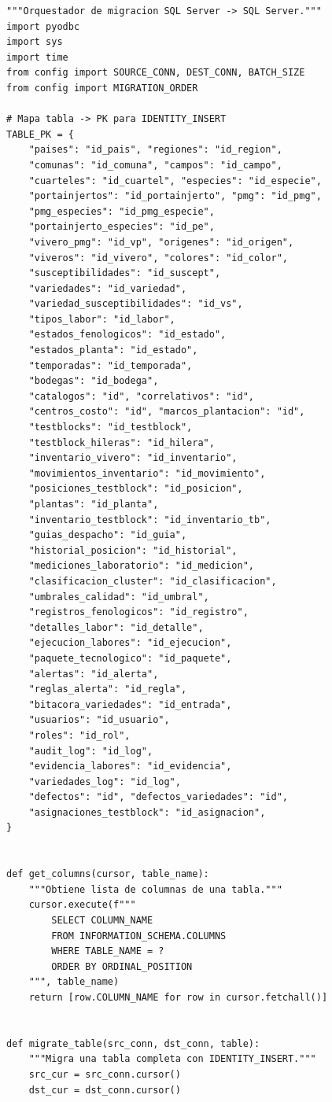 \documentclass[12pt,a4paper,twoside]{report}
\begin{document}
\begin{lstlisting}[style=pythonstyle, caption={migrate.py --- Orquestador principal}]
"""Orquestador de migracion SQL Server -> SQL Server."""
import pyodbc
import sys
import time
from config import SOURCE_CONN, DEST_CONN, BATCH_SIZE
from config import MIGRATION_ORDER

# Mapa tabla -> PK para IDENTITY_INSERT
TABLE_PK = {
    "paises": "id_pais", "regiones": "id_region",
    "comunas": "id_comuna", "campos": "id_campo",
    "cuarteles": "id_cuartel", "especies": "id_especie",
    "portainjertos": "id_portainjerto", "pmg": "id_pmg",
    "pmg_especies": "id_pmg_especie",
    "portainjerto_especies": "id_pe",
    "vivero_pmg": "id_vp", "origenes": "id_origen",
    "viveros": "id_vivero", "colores": "id_color",
    "susceptibilidades": "id_suscept",
    "variedades": "id_variedad",
    "variedad_susceptibilidades": "id_vs",
    "tipos_labor": "id_labor",
    "estados_fenologicos": "id_estado",
    "estados_planta": "id_estado",
    "temporadas": "id_temporada",
    "bodegas": "id_bodega",
    "catalogos": "id", "correlativos": "id",
    "centros_costo": "id", "marcos_plantacion": "id",
    "testblocks": "id_testblock",
    "testblock_hileras": "id_hilera",
    "inventario_vivero": "id_inventario",
    "movimientos_inventario": "id_movimiento",
    "posiciones_testblock": "id_posicion",
    "plantas": "id_planta",
    "inventario_testblock": "id_inventario_tb",
    "guias_despacho": "id_guia",
    "historial_posicion": "id_historial",
    "mediciones_laboratorio": "id_medicion",
    "clasificacion_cluster": "id_clasificacion",
    "umbrales_calidad": "id_umbral",
    "registros_fenologicos": "id_registro",
    "detalles_labor": "id_detalle",
    "ejecucion_labores": "id_ejecucion",
    "paquete_tecnologico": "id_paquete",
    "alertas": "id_alerta",
    "reglas_alerta": "id_regla",
    "bitacora_variedades": "id_entrada",
    "usuarios": "id_usuario",
    "roles": "id_rol",
    "audit_log": "id_log",
    "evidencia_labores": "id_evidencia",
    "variedades_log": "id_log",
    "defectos": "id", "defectos_variedades": "id",
    "asignaciones_testblock": "id_asignacion",
}


def get_columns(cursor, table_name):
    """Obtiene lista de columnas de una tabla."""
    cursor.execute(f"""
        SELECT COLUMN_NAME
        FROM INFORMATION_SCHEMA.COLUMNS
        WHERE TABLE_NAME = ?
        ORDER BY ORDINAL_POSITION
    """, table_name)
    return [row.COLUMN_NAME for row in cursor.fetchall()]


def migrate_table(src_conn, dst_conn, table):
    """Migra una tabla completa con IDENTITY_INSERT."""
    src_cur = src_conn.cursor()
    dst_cur = dst_conn.cursor()


\end{lstlisting}
\end{document}
